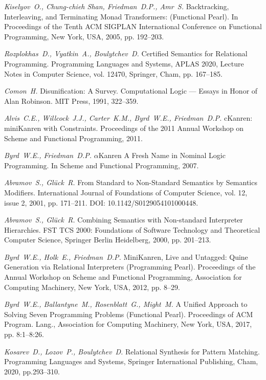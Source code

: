 {\em Kiselyov~O., Chung-chieh Shan, Friedman~D.P., Amr~S.} Backtracking, Interleaving, and Terminating Monad Transformers: (Functional Pearl). In Proceedings of the Tenth ACM SIGPLAN International Conference on Functional Programming, New York, USA, 2005, pp. 192--203.

{\em Rozplokhas~D., Vyatkin~A., Boulytchev~D.} Certified Semantics for Relational Programming. Programming Languages and Systems, APLAS 2020, Lecture Notes in Computer Science, vol. 12470, Springer, Cham, pp. 167--185.

{\em Comon~H.}  Disunification: A Survey. Computational Logic --- Essays in Honor of Alan Robinson. MIT Press, 1991, 322--359.

{\em Alvis~C.E., Willcock~J.J., Carter~K.M., Byrd~W.E., Friedman~D.P.} cKanren: miniKanren with Constraints. Proceedings of the 2011 Annual Workshop on Scheme and Functional Programming, 2011.

{\em Byrd~W.E., Friedman~D.P.} $\alpha$Kanren A Fresh Name in Nominal Logic Programming. In Scheme and Functional Programming, 2007.

{\em Abramov~S., Gl{\"u}ck~R.} From Standard to Non-Standard Semantics by Semantics Modifiers. International Journal of Foundations of Computer Science, vol. 12, issue 2, 2001, pp. 171--211. DOI: 10.1142/S0129054101000448.

{\em Abramov~S., Gl{\"u}ck~R.} Combining Semantics with Non-standard Interpreter Hierarchies. FST TCS 2000: Foundations of Software Technology and Theoretical Computer Science, Springer Berlin Heidelberg, 2000, pp. 201--213.

{\em Byrd~W.E., Holk~E., Friedman~D.P.} MiniKanren, Live and Untagged: Quine Generation via Relational Interpreters (Programming Pearl). Proceedings of the Annual Workshop on Scheme and Functional Programming, Association for Computing Machinery, New York, USA, 2012, pp. 8--29.

{\em Byrd~W.E., Ballantyne~M., Rosenblatt~G., Might~M.} A Unified Approach to Solving Seven Programming Problems (Functional Pearl). Proceedings of ACM Program. Lang., Association for Computing Machinery, New York, USA, 2017, pp. 8:1--8:26.

{\em Kosarev~D., Lozov~P., Boulytchev~D.} Relational Synthesis for Pattern Matching. Programming Languages and Systems, Springer International Publishing, Cham, 2020, pp.293--310.

